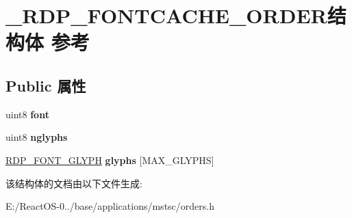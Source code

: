 \hypertarget{struct___r_d_p___f_o_n_t_c_a_c_h_e___o_r_d_e_r}{}\section{\+\_\+\+R\+D\+P\+\_\+\+F\+O\+N\+T\+C\+A\+C\+H\+E\+\_\+\+O\+R\+D\+E\+R结构体 参考}
\label{struct___r_d_p___f_o_n_t_c_a_c_h_e___o_r_d_e_r}
\subsection*{Public 属性}
\begin{DoxyCompactItemize}
\item 
\mbox{\label{struct___r_d_p___f_o_n_t_c_a_c_h_e___o_r_d_e_r_a7d8cd334143eb9286938878c03f0854b}} 
uint8 {\bfseries font}
\item 
\mbox{\label{struct___r_d_p___f_o_n_t_c_a_c_h_e___o_r_d_e_r_a6f54250b6a999f95e290f68db54707b4}} 
uint8 {\bfseries nglyphs}
\item 
\mbox{\label{struct___r_d_p___f_o_n_t_c_a_c_h_e___o_r_d_e_r_aa6b7bb66ae512fa5f87133a3417e8d81}} 
\hyperlink{struct___r_d_p___f_o_n_t___g_l_y_p_h}{R\+D\+P\+\_\+\+F\+O\+N\+T\+\_\+\+G\+L\+Y\+PH} {\bfseries glyphs} \mbox{[}M\+A\+X\+\_\+\+G\+L\+Y\+P\+HS\mbox{]}
\end{DoxyCompactItemize}


该结构体的文档由以下文件生成\+:\begin{DoxyCompactItemize}
\item 
E\+:/\+React\+O\+S-\/0../base/applications/mstsc/orders.\+h\end{DoxyCompactItemize}
